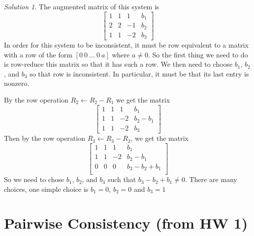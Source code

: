 \documentclass{article}
\theoremstyle{remark}
\newtheorem*{solution}{Solution}
\begin{document}
\begin{solution}
  The augmented matrix of this system is
  \begin{displaymath}
    \begin{bmatrix}
      1 & 1 & 1 & b_1 \\
      2 & 2 & -1 & b_2 \\
      1  & 1 & -2 & b_3
    \end{bmatrix}
  \end{displaymath}
  In order for this system to be inconsistent, it must be row equivalent to a matrix with a row of the form $[0 \ 0 \ \dots \ 0 \ a]$ where $a \not = 0$.
  So the first thing we need to do is row-reduce this matrix so that it has such a row.
  We then need to choose $b_1$, $b_2$, and $b_3$ so that row is inconsistent.
  In particular, it must be that its last entry is nonzero.

  By the row operation $R_2 \gets R_2 - R_1$ we get the matrix
  \begin{displaymath}
    \begin{bmatrix}
      1 & 1 & 1 & b_1 \\
      1 & 1 & -2 & b_2 - b_1 \\
      1 & 1 & -2 & b_3
    \end{bmatrix}
  \end{displaymath}
  Then by the row operation $R_3 \gets R_3 - R_2$, we get the matrix
  \begin{displaymath}
    \begin{bmatrix}
      1 & 1 & 1 & b_1 \\
      1 & 1 & -2 & b_2 - b_1 \\
      0 & 0 & 0 & b_3 - b_2 + b_1\\
    \end{bmatrix}
  \end{displaymath}
  So we need to chose $b_1$, $b_2$, and $b_3$ such that $b_3 - b_2 + b_1 \not = 0$.
  There are many choices, one simple choice is $b_1 = 0$, $b_2 = 0$ and $b_3 = 1$
\end{solution}

\pagebreak
\section{Pairwise Consistency (from HW 1)}
\end{document}
